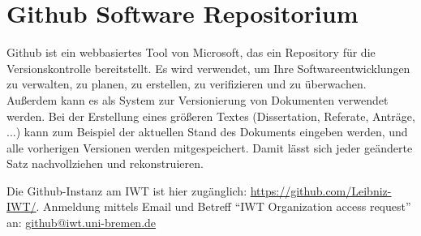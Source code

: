 \section{Github Software Repositorium}

Github ist ein webbasiertes Tool von Microsoft, das ein Repository für die Versionskontrolle
bereitstellt. Es wird verwendet, um Ihre Softwareentwicklungen zu verwalten, zu
planen, zu erstellen, zu verifizieren und zu überwachen. Außerdem kann es als
System zur Versionierung von Dokumenten verwendet werden. Bei der Erstellung
eines größeren Textes (Dissertation, Referate, Anträge, ...) kann zum
Beispiel der aktuellen Stand des Dokuments eingeben werden, und alle vorherigen
Versionen werden mitgespeichert. Damit lässt sich jeder geänderte Satz
nachvollziehen und rekonstruieren.

Die Github-Instanz am IWT ist hier zugänglich: \url{https://github.com/Leibniz-IWT/}.
Anmeldung mittels Email und Betreff “IWT Organization access request” an:
\href{mailto:github@iwt.uni-bremen.de}%
{github@iwt.uni-bremen.de}
